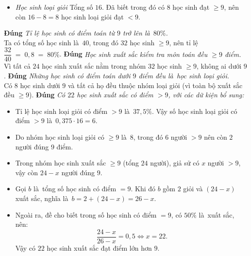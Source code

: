 \begin{ex}
{\begin{itemize}
			 \item \textit{Học sinh loại giỏi}
			Tổng số $16$.  Đã biết trong đó có $8$ học sinh đạt $\ge 9$, nên còn $16 - 8 = 8$ học sinh loại giỏi đạt $<9$.
		\end{itemize}
		\begin{itemchoice}
			\itemch \textbf{Đúng} \textit{Tỉ lệ học sinh có điểm toán  từ $9$ trở lên là~$80\%$.}\\
			Ta có tổng số học sinh  là~$40$, trong đó $32$ học sinh $\ge 9$, nên tỉ lệ $\dfrac{32}{40} \;=\; 0{,}8 \;=\; 80\%$.
			\itemch \textbf{Đúng} \textit{Học sinh xuất sắc kiểm tra môn toán  đều $\ge 9$ điểm.}\\
			Vì tất  cả $24$ học sinh xuất sắc nằm trong nhóm $32$ học sinh $\ge 9$, không ai dưới $9$.
			\itemch \textbf{Đúng} \textit{Những học sinh có điểm toán dưới $9$ điểm đều là~học  sinh loại giỏi.}\\
			Có $8$ học sinh dưới $9$ và tất cả họ đều thuộc nhóm loại  giỏi (vì toàn bộ xuất sắc đều $\ge 9$).
			\itemch \textbf{Đúng} \textit{Có $22$ học sinh xuất sắc có điểm $>9$, với các dữ kiện bổ  sung:}
			\begin{itemize}
				\item  Tỉ lệ học sinh loại giỏi có điểm $>9$ là~$37,5\%$. Vậy số học sinh loại giỏi có điểm $>9$ là~$0{,}375 \cdot 16 = 6$.
				\item Do nhóm học sinh loại giỏi có $\ge 9$ là~$8$, trong đó $6$ người  $>9$ nên còn $2$ người đúng $9$ điểm.
				\item  Trong nhóm học sinh xuất sắc $\ge 9$ (tổng $24$ người), giả sử có $x$ người $>9$, vậy còn $24 - x$ người đúng $9$.
				\item Gọi $b$ là~tổng số học sinh có điểm $=9$. Khi đó $b$ gồm $2$ giỏi  và $(24 - x)$ xuất sắc, nghĩa là~$b =2+(24 - x)=26 - x$.
				\item Ngoài ra, đề cho  biết trong số học sinh có điểm $=9$, có $50\%$ là~xuất sắc, nên:
				$$\dfrac{24 - x}{26  - x}= 0{,}5\Leftrightarrow x=22.$$
				Vậy có $22$ học sinh  xuất sắc đạt điểm lớn hơn $9$.
			\end{itemize}
		\end{itemchoice}
	 }
\end{ex}

